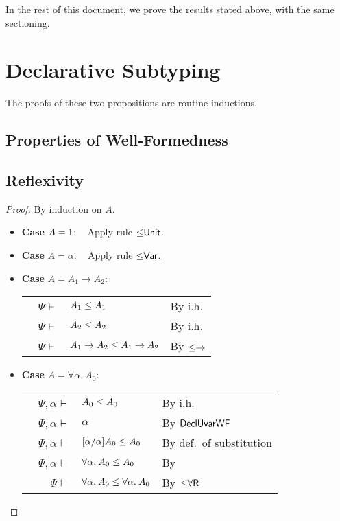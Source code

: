 \documentclass[a4paper]{article}
\makeatletter
\newcounter{zzbackby}
\newcommand{\backby}[2]{\setcounter{zzbackby}{\uccode`#1}\addtocounter{zzbackby}{-#2}\char\value{zzbackby}}
\newcommand{\XAlph}[1]{\backby{\Alph{section}}{#1}}
\newcommand{\arr}{\rightarrow}
\def\CompactJudgments{0}
\newcommand{\entails}{\mathrel{\ifnum\CompactJudgments=1\vdash \else \vdash\,\fi}}
\newcommand{\tyname}[1]{\textsf{\normalfont #1}}
\newcommand{\unitty}{\tyname{1}}
\newcommand{\ProofCaseRule}[1]{\item \textbf{Case }\textrm{{#1}}: ~ }
\newcommand{\ProofCaseThing}[1]{\ProofCaseRule{\ensuremath{#1}}}
\newcommand{\BeginProof}{\renewcommand{\arraystretch}{1.1} \begin{tabular}[b]{r@{}r @{} l  l}}
\newcommand{\EndProof}{\end{tabular} \renewcommand{\arraystretch}{\mydefaultarraystretch}}
\newcommand{\Pf}[4] {&$#1$ $#2$\, & $#3$ & #4 \\}
\newenvironment{llproof}{\BeginProof}{\EndProof}
\newcommand{\AllSym}{\forall}
\newcommand{\xAll}[1]{\AllSym#1}
\newcommand{\All}[1]{\xAll{#1}.\:}
\newcommand{\declsubjudgPf}[4] {\Pf{#1}{\entails}{{#2} \declsubtype {#3}}{#4}}
\newcommand{\alltype}[1]{\All{#1}}
\newcommand{\judgetpPf}[3]{\Pf{#1}{\entails}{#2}{#3}}
\newcommand{\rulename}[1]{\text{\normalfont\textsf{#1}}}
\newcommand{\Dsubrulename}[1]{\ensuremath{{\declsubtype}\rulename{#1}}\xspace}
\newcommand{\DsubVar}{\Dsubrulename{Var}}
\newcommand{\DsubUnit}{\Dsubrulename{Unit}}
\newcommand{\DsubArr}{\Dsubrulename{\ensuremath{\arr}}}
\newcommand{\DsubAllR}{\Dsubrulename{\ensuremath{\forall}{R}}}
\newcommand{\DeclWFrulename}[1]{\ensuremath{\rulename{Decl{#1}WF}}\xspace}
\newcommand{\DeclUvarWF}{\DeclWFrulename{Uvar}}
\makeatother
\begin{document}
\setcounter{savedsection}{\value{section}}


\renewcommand{\thesection}{\XAlph{12}$'$}

In the rest of this document, we prove the results stated above, with the same sectioning.



\section{Declarative Subtyping}

\propweakening*

\propsubst*

The proofs of these two propositions are routine inductions. 


\subsection{Properties of Well-Formedness}

\subsection{Reflexivity}

\declarativereflexivity*
\begin{proof}  By induction on $A$.

  \begin{itemize}
  \ProofCaseThing{A = \unitty}  Apply rule \DsubUnit.
   
  \ProofCaseThing{A = \alpha}  Apply rule \DsubVar.

  \ProofCaseThing{A = A_1 \arr A_2}

      \begin{llproof}
      \declsubjudgPf{\Psi}{A_1}{A_1}   {By i.h.}
      \declsubjudgPf{\Psi}{A_2}{A_2}   {By i.h.}
      \declsubjudgPf{\Psi}{A_1 \arr A_2}{A_1 \arr A_2}   {By \DsubArr}
      \end{llproof}

  \ProofCaseThing{A = \alltype{\alpha}{A_0}}
  
      \begin{llproof}
      \declsubjudgPf{\Psi, \alpha}{A_0}{A_0}   {By i.h.}
      \judgetpPf{\Psi, \alpha}{\alpha}   {By \DeclUvarWF}
      \declsubjudgPf{\Psi, \alpha}{[\alpha/\alpha]A_0}{A_0}   {By def.\ of substitution}
      \declsubjudgPf{\Psi, \alpha}{\alltype{\alpha}{A_0}}{A_0}   {By \DsubAllL}
      \declsubjudgPf{\Psi}{\alltype{\alpha}{A_0}}{\alltype{\alpha}{A_0}}   {By \DsubAllR}
      \end{llproof}
      \qedhere
  \end{itemize}
\end{proof}
\end{document}
